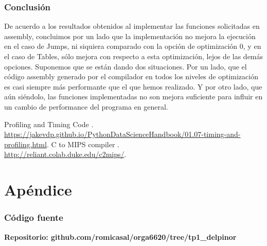 \documentclass[a4paper, 10pt, twoside, notitlepage]{article}
\begin{document}
\newpage

\section{Conclusión}
De acuerdo a los resultados obtenidos al implementar las funciones solicitadas en assembly, concluimos por un lado que la implementación no mejora la ejecución en el caso de Jumps, ni siquiera comparado con la opción de optimización 0, y en el caso de Tables, sólo mejora con respecto a esta optimización, lejos de las demás opciones.
Suponemos que se están dando dos situaciones. Por un lado, que el código assembly generado por el compilador en todos los niveles de optimización es casi siempre más performante que el que hemos realizado. Y por otro lado, que aún siéndolo, las funciones implementadas no son mejora suficiente para influir en un cambio de performance del programa en general.

\vspace{.5cm}
\begin{thebibliography}{5}
 \bibitem{} Profiling and Timing Code
.\\ \url{https://jakevdp.github.io/PythonDataScienceHandbook/01.07-timing-and-profiling.html}.
 \bibitem{} C to MIPS compiler
.\\ \url{http://reliant.colab.duke.edu/c2mips/}.

\end{thebibliography}

\clearpage

\part{Apéndice}
\appendix

\normalsize
\section{Código fuente}\label{sec:codigofuente}

\textbf{Repositorio: github.com/romicasal/orga6620/tree/tp1\_delpinor}
\end{document}
